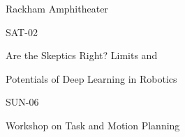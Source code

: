 \documentclass{article}
\begin{document}
\rssheader[1in]

\fontsize{32pt}{36pt}
\selectfont
\begin{center}
Rackham Amphitheater
\end{center}

\vfill

\fontsize{48pt}{56pt}
\selectfont
\begin{center}
SAT-02
\end{center}

\fontsize{24pt}{28pt}
\selectfont
\begin{center}
Are the Skeptics Right? Limits and \par \noindent Potentials of Deep Learning in Robotics
\end{center}

\vfill

\fontsize{48pt}{56pt}
\selectfont
\begin{center}
SUN-06
\end{center}

\fontsize{24pt}{24pt}
\selectfont
\begin{center}
Workshop on Task and Motion Planning
\end{center}

\vfill
\end{document}
